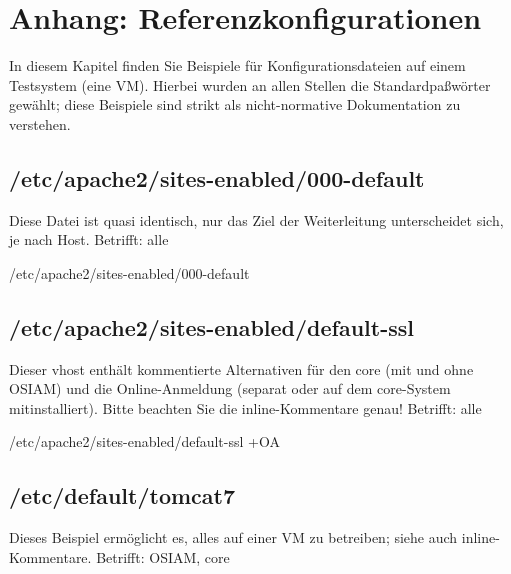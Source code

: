 \ifupgradeanleitung\else%

\section{Anhang: Referenzkonfigurationen}\label{sec:refcfg}

In diesem Kapitel finden Sie Beispiele für Konfigurationsdateien
auf einem Testsystem (eine VM). Hierbei wurden an allen Stellen
die Standardpaßwörter gewählt; diese Beispiele sind strikt als
nicht-normative Dokumentation zu verstehen.


\subsection{/etc/apache2/sites-enabled/000-default}\label{subsec:refcfg-apache-default}

\ifoa
Diese Datei ist quasi identisch, nur das Ziel der Weiterleitung
unterscheidet sich, je nach Host. Betrifft: alle
\fi%

\begin{lstdump}{/etc/apache2/sites-enabled/000-default}
\end{lstdump}

\ifoa
\subsection{/etc/apache2/sites-enabled/default-ssl}\label{subsec:refcfg-apache-defssl}

Dieser vhost enthält kommentierte Alternativen für den core
(mit und ohne OSIAM) und die Online-Anmeldung (separat oder
auf dem core-System mitinstalliert). Bitte beachten Sie die
inline-Kommentare genau! Betrifft: alle

\begin{lstdump}{/etc/apache2/sites-enabled/default-ssl +OA}
\end{lstdump}

\subsection{/etc/default/tomcat7}\label{subsec:refcfg-tcdef}

Dieses Beispiel ermöglicht es, alles auf einer VM zu betreiben;
siehe auch inline-Kommentare. Betrifft: OSIAM, core

